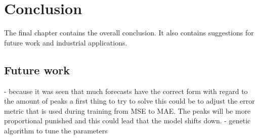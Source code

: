 \chapter{Conclusion}
\label{cha:conclusion}
The final chapter contains the overall conclusion. It also contains
suggestions for future work and industrial applications.

\section{Future work}

- because it was seen that much forecasts have the correct form with regard to the amount of peaks a first thing to try to solve this could be to adjust the error metric that is used during training from MSE to MAE. The peaks will be more proportional punished and this could lead that the model shifts down. 
- genetic algorithm to tune the parameters

